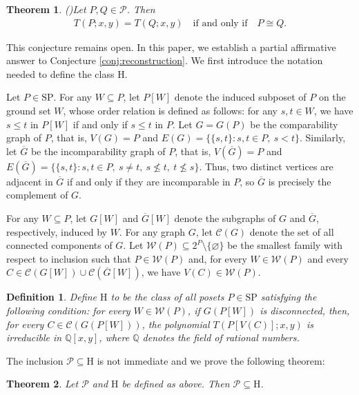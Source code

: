 \documentclass[11pt,a4paper]{article}
\newtheorem{theorem}{Theorem}[section]
\newtheorem{definition}{Definition}[section]
\begin{document}
\begin{theorem}(\cite{Gordon1996})\label{thm:theorem33-43}
Let $P,Q\in\mathcal{P}$. Then
\begin{eqnarray*}
T(P;x,y)=T(Q;x,y)\quad\text{if and only if}\quad P\cong Q.
\end{eqnarray*}
\end{theorem}

This conjecture remains open.
In this paper, we establish a partial affirmative answer to Conjecture \ref{conj:reconstruction}.
We first introduce the notation needed to define the class $\mathrm H$.

Let $P\in\mathrm{SP}$.
For any $W\subseteq P$, let $P[W]$ denote the induced subposet of $P$
on the ground set $W$, whose order relation is defined as follows:
for any $s,t\in W$, we have $s\le t$ in $P[W]$ if and only if $s\le t$ in $P$.
Let $G=G(P)$ be the comparability graph of $P$, that is,
$V(G)=P$ and $E(G)=\{\{s,t\}:s,t\in P,\ s<t\}$.
Similarly, let $\overline G$ be the incomparability graph of $P$,
that is, $V(\overline G)=P$ and $E(\overline G)=\{\{s,t\}:s,t\in P,\ s\neq t,\ s\nleq t,\ t\nleq s\}$.
Thus, two distinct vertices are adjacent in $\overline G$ if and only if they are incomparable in $P$,
so $\overline G$ is precisely the complement of $G$.

For any $W\subseteq P$, let $G[W]$ and $\overline G[W]$ denote 
the subgraphs of $G$ and $\overline G$, respectively, induced by $W$.
For any graph $G$, let $\mathcal C(G)$ denote the set of all connected components of $G$.
Let $\mathcal W(P)\subseteq 2^P\setminus\{\varnothing\}$
be the smallest family with respect to inclusion such that
$P\in\mathcal W(P)$ and, for every $W\in\mathcal W(P)$ and every
$C\in\mathcal C(G[W])\cup\mathcal C(\overline G[W])$, we have $V(C)\in\mathcal W(P)$.

\begin{definition}\label{def:poset-h}
Define $\mathrm H$ to be the class of all posets $P\in\mathrm{SP}$
satisfying the following condition:
for every $W\in\mathcal W(P)$, if $G(P[W])$ is disconnected,
then, for every $C\in\mathcal C(G(P[W]))$,
the polynomial $T(P[V(C)];x,y)$ is irreducible in $\mathbb Q[x,y]$,
where $\mathbb Q$ denotes the field of rational numbers.
\end{definition}

The inclusion $\mathcal P\subseteq\mathrm H$ is not immediate and we prove the following theorem:

\begin{theorem}\label{thm:main-sub}
Let $\mathcal P$ and $\mathrm H$ be defined as above.
Then $\mathcal P\subseteq\mathrm H$.
\end{theorem}
\end{document}
